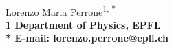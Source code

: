 \documentclass[11pt,letterpaper]{article}
\begin{document}
\vspace*{0.30in}

\begin{flushleft}
{\Large
\textbf{}
}
\newline
\\
Lorenzo Maria Perrone\textsuperscript{1, *}
\\
\bf{1} Department of Physics, EPFL
\\

% 
%





* E-mail: lorenzo.perrone@epfl.ch
\end{flushleft}
\end{document}
